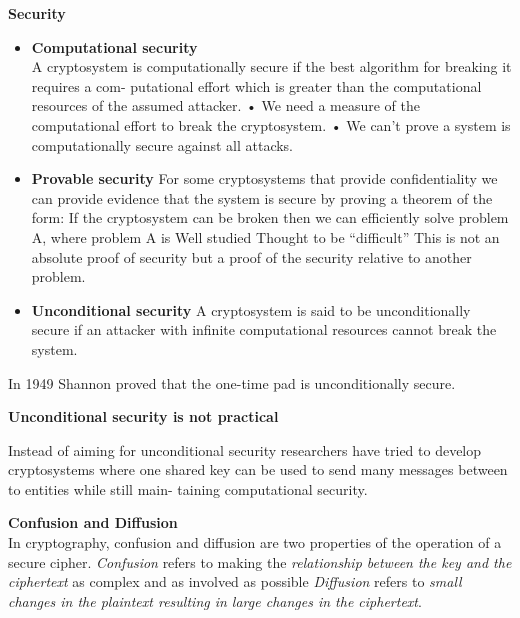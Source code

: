 \textbf{Security}
\begin{itemize}
    \item \textbf{Computational security}\\
        A cryptosystem is computationally secure if the best algorithm for breaking it requires a com- putational effort which is greater than the computational resources of the assumed attacker.
        • We need a measure of the computational effort to break the cryptosystem. • We can’t prove a system is computationally secure against all attacks.

    \item \textbf{Provable security}
        For some cryptosystems that provide confidentiality we can provide evidence that the system is secure by proving a theorem of the form:
        If the cryptosystem can be broken then we can efficiently solve problem A, where problem A is
        Well studied
        Thought to be “difficult”
        This is not an absolute proof of security but a proof of the security relative to another problem.

    \item \textbf{Unconditional security}
        A cryptosystem is said to be unconditionally secure if an attacker with infinite computational resources cannot break the system.

\end{itemize}

In 1949 Shannon proved that the one-time pad is unconditionally secure.
\begin{definition}
\end{definition}

\textbf{Unconditional security is not practical}

Instead of aiming for unconditional security researchers have tried to develop cryptosystems where one shared key can be used to send many messages between to entities while still main- taining computational security.


\textbf{Confusion and Diffusion}\\
In cryptography, confusion and diffusion are two properties of the operation of a secure cipher.
\textit{Confusion} refers to making the \textit{relationship between the key and the ciphertext} as complex and as involved as possible
\textit{Diffusion} refers to \textit{small changes in the plaintext resulting in large changes in the ciphertext}.
